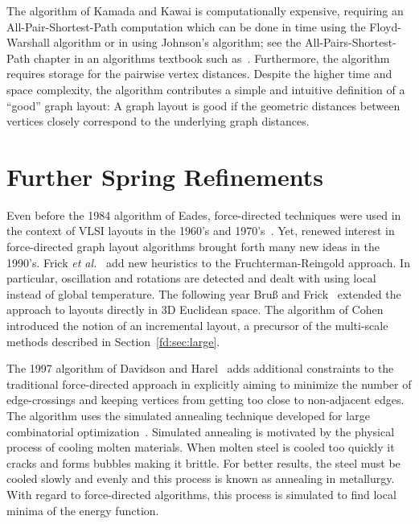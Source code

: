 \documentclass[notitlepage,letter,11pt]{article}
\begin{document}
The algorithm of Kamada and Kawai is computationally expensive,
requiring an All-Pair-Shortest-Path computation which can be done in
time using the Floyd-Warshall algorithm or in  using Johnson's algorithm;
see the All-Pairs-Shortest-Path chapter
in an algorithms textbook such as~\cite{clrs-ia-90}. Furthermore, the
algorithm requires  storage for the pairwise vertex
distances. Despite the higher time and space complexity, the algorithm
contributes a simple and intuitive definition of a ``good'' graph
layout: A graph layout is good if the geometric distances between
vertices closely correspond to the underlying graph distances.






\section{Further Spring Refinements}
\label{fd:sec:ar} 

Even before the 1984 algorithm of Eades, force-directed techniques
were used in the context of VLSI layouts in the 1960's and
1970's~\cite{fcw-accel-67,qb-fdcpp-79}. Yet, renewed interest in
force-directed graph layout algorithms brought forth many new ideas in
the 1990's. Frick {\em et al.}~\cite{flm-falau-95} add new
heuristics to the Fruchterman-Reingold approach. In particular,
oscillation and rotations are detected and dealt with using local
instead of global temperature. The following year Bru{\ss} and
Frick~\cite{bf-fi3dg-96} extended the approach to layouts directly in
3D Euclidean space. The algorithm of Cohen~\cite{ACMTOCHI::Cohen1997}
introduced the notion of an incremental layout, a precursor of the
multi-scale methods described in Section~\ref{fd:sec:large}.

The 1997 algorithm of Davidson and Harel~\cite{dh-dgnus-96} adds
additional constraints to the traditional force-directed approach in
explicitly aiming to minimize the number of edge-crossings and keeping
vertices from getting too close to non-adjacent edges. The algorithm
uses the simulated annealing technique developed for large
combinatorial optimization~\cite{kirkpatrick83optimization}. Simulated
annealing is motivated by the physical process of cooling molten
materials. When molten steel is cooled too quickly it cracks and forms
bubbles making it brittle. For better results, the steel must be
cooled slowly and evenly and this process is known as annealing in
metallurgy. With regard to force-directed algorithms, this process is
simulated to find local minima of the energy function. 
\end{document}
